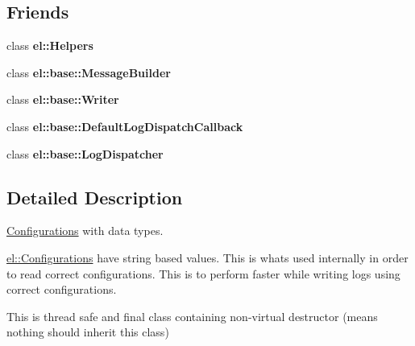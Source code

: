 \subsection*{Friends}
\begin{DoxyCompactItemize}
\item 
class {\bfseries el\+::\+Helpers}\hypertarget{classel_1_1base_1_1TypedConfigurations_a2fb8a2c02cbf86247f093c118bed877a}{}\label{classel_1_1base_1_1TypedConfigurations_a2fb8a2c02cbf86247f093c118bed877a}

\item 
class {\bfseries el\+::base\+::\+Message\+Builder}\hypertarget{classel_1_1base_1_1TypedConfigurations_a81bbf6fe31fab133d182efa8367304f1}{}\label{classel_1_1base_1_1TypedConfigurations_a81bbf6fe31fab133d182efa8367304f1}

\item 
class {\bfseries el\+::base\+::\+Writer}\hypertarget{classel_1_1base_1_1TypedConfigurations_a7a728edbb2761d151832daa74d5b2736}{}\label{classel_1_1base_1_1TypedConfigurations_a7a728edbb2761d151832daa74d5b2736}

\item 
class {\bfseries el\+::base\+::\+Default\+Log\+Dispatch\+Callback}\hypertarget{classel_1_1base_1_1TypedConfigurations_a42b1de96d584ae4fecbfc2b9aff95052}{}\label{classel_1_1base_1_1TypedConfigurations_a42b1de96d584ae4fecbfc2b9aff95052}

\item 
class {\bfseries el\+::base\+::\+Log\+Dispatcher}\hypertarget{classel_1_1base_1_1TypedConfigurations_a9b37b28ea1c5f8f862cc89f135711d92}{}\label{classel_1_1base_1_1TypedConfigurations_a9b37b28ea1c5f8f862cc89f135711d92}

\end{DoxyCompactItemize}


\subsection{Detailed Description}
\hyperlink{classel_1_1Configurations}{Configurations} with data types. 

\hyperlink{classel_1_1Configurations}{el\+::\+Configurations} have string based values. This is whats used internally in order to read correct configurations. This is to perform faster while writing logs using correct configurations.

This is thread safe and final class containing non-\/virtual destructor (means nothing should inherit this class) 

